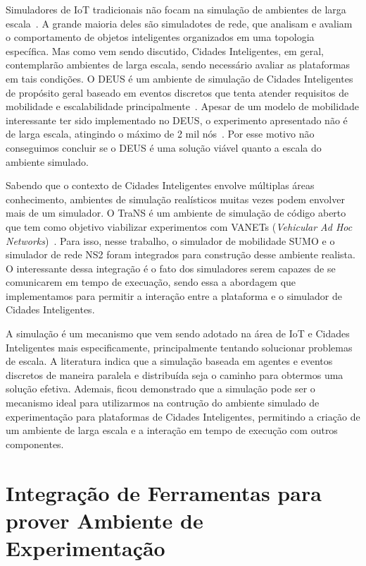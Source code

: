 Simuladores de IoT tradicionais não focam na simulação de ambientes de larga escala~\cite{brambilla_2014}.
A grande maioria deles são simuladotes de rede, que analisam e avaliam o comportamento de objetos inteligentes organizados em uma topologia específica.
Mas como vem sendo discutido, Cidades Inteligentes, em geral, contemplarão ambientes de larga escala, sendo necessário avaliar as plataformas em tais condições.
O DEUS é um ambiente de simulação de Cidades Inteligentes de propósito geral baseado em eventos discretos que tenta atender requisitos de mobilidade e escalabilidade principalmente~\cite{picone_2012}.
Apesar de um modelo de mobilidade interessante ter sido implementado no DEUS, o experimento apresentado não é de larga escala, atingindo o máximo de 2 mil nós~\cite{picone_2012}.
Por esse motivo não conseguimos concluir se o DEUS é uma solução viável quanto a escala do ambiente simulado.

Sabendo que o contexto de Cidades Inteligentes envolve múltiplas áreas conhecimento, ambientes de simulação realísticos muitas vezes podem envolver mais de um simulador.
O TraNS é um ambiente de simulação de código aberto que tem como objetivo viabilizar experimentos com VANETs (\textit{Vehicular Ad Hoc Networks})~\cite{piorkowski_2008}.
Para isso, nesse trabalho, o simulador de mobilidade SUMO e o simulador de rede NS2 foram integrados para construção desse ambiente realista.
O interessante dessa integração é o fato dos simuladores serem capazes de se comunicarem em tempo de execuação, sendo essa a abordagem que implementamos para permitir a interação entre a plataforma
e o simulador de Cidades Inteligentes.

A simulação é um mecanismo que vem sendo adotado na área de IoT e Cidades Inteligentes mais especificamente, principalmente tentando solucionar problemas de escala.
A literatura indica que a simulação baseada em agentes e eventos discretos de maneira paralela e distribuída seja o caminho para obtermos uma solução efetiva.
Ademais, ficou demonstrado que a simulação pode ser o mecanismo ideal para utilizarmos na contrução do ambiente simulado de experimentação para plataformas de Cidades Inteligentes, permitindo a criação
de um ambiente de larga escala e a interação em tempo de execução com outros componentes.

\section{Integração de Ferramentas para prover Ambiente de Experimentação}

